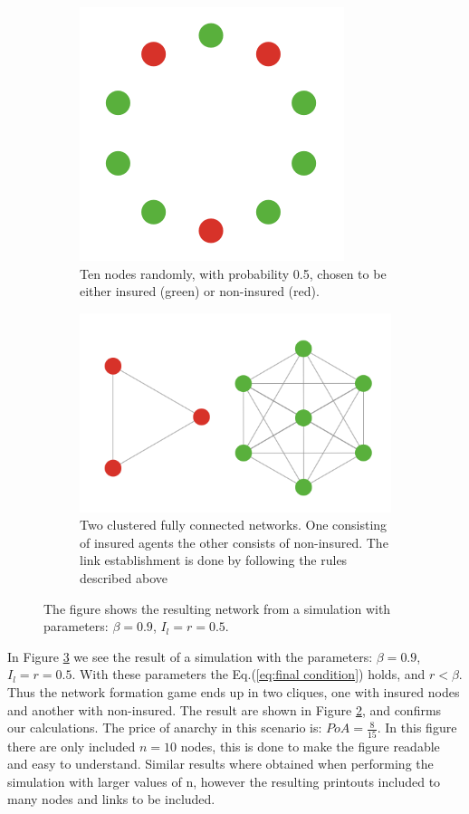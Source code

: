 \begin{figure}[h]
\centering
\begin{subfigure}{.5\textwidth}
  \centering
  \includegraphics[width=0.4\linewidth]{../Figures/FirstSimulationStart.png}
  \caption{\label{fig:firstsimulation:a} Ten nodes randomly, with probability 0.5, chosen to be either insured (green) or non-insured (red).}
\end{subfigure}
\quad
\begin{subfigure}{.46\textwidth}
  \centering
  \includegraphics[width=0.8\linewidth]{../Figures/FirstSimulationResult.png}
  \caption{\label{fig:firstsimulation:b} Two clustered fully connected networks. One consisting of insured agents the other consists of non-insured. The link establishment is done by following the rules described above}
\end{subfigure}
\caption{\label{fig:firstsimulation} The figure shows the resulting network from a simulation with parameters: $\beta=0.9$, $I_{l}=r=0.5$.}
\end{figure}
In Figure \ref{fig:firstsimulation} we see the result of a simulation with the parameters: $\beta=0.9$, $I_{l}=r=0.5$. With these parameters the Eq.(\ref{eq:final condition}) holds, and $r<\beta$. Thus the network formation game ends up in two cliques, one with insured nodes and another with non-insured. The result are shown in Figure \ref{fig:firstsimulation:b}, and confirms our calculations.
The price of anarchy in this scenario is: $PoA=\frac{8}{15}$.
In this figure there are only included $n=10$ nodes, this is done to make the figure readable and easy to understand.
Similar results where obtained when performing the simulation with larger values of n, however the resulting printouts included to many nodes and links to be included. 

